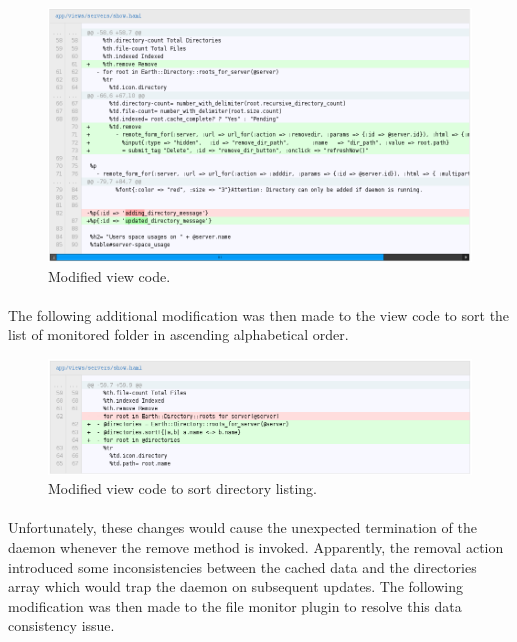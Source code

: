 \documentclass[10pt,a4,oneside]{article}
\begin{document}
\begin{figure}[h!]
\begin{centering}
\includegraphics[width=150mm]{figs/earthview}
\end{centering}
\caption{Modified view code.}
\label{fig:earthview}
\end{figure}



\newpage

\paragraph{}
The following additional modification was then made to the view code 
to sort the list of monitored folder in ascending alphabetical order.


\begin{figure}[h!]
\begin{centering}
\includegraphics[width=150mm]{figs/earthshow2}
\end{centering}
\caption{Modified view code to sort directory listing.}
\label{fig:earthshow2}
\end{figure}


\newpage

\paragraph{}
Unfortunately, these changes would cause the unexpected termination 
of the daemon whenever the remove method is invoked. Apparently, the 
removal action introduced some inconsistencies between the cached 
data and the directories array which would trap the daemon on 
subsequent updates. The following modification was then made to the 
file monitor plugin to resolve this data consistency issue.
\end{document}

